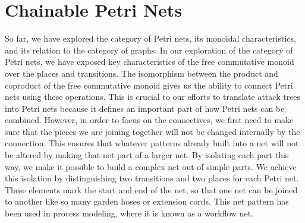 \section{Chainable Petri Nets}
So far, we have explored the category of Petri nets, its monoidal characteristics, and its relation to the category of graphs. In our exploration of the category of Petri nets, we have exposed key characteristics of the free commutative monoid over the places and transitions. The isomorphism between the product and coproduct of the free commutative monoid gives us the ability to connect Petri nets using these operations. This is crucial to our efforts to translate attack trees into Petri nets because it defines an important part of how Petri nets can be combined. However, in order to focus on the connectives, we first need to make sure that the pieces we are joining together will not be changed internally by the connection. This ensures that whatever patterns already built into a net will not be altered by making that net part of a larger net. By isolating each part this way, we make it possible to build a complex net out of simple parts. We achieve this isolation by distinguishing two transitions and two places for each Petri net. These elements mark the start and end of the net, so that one net can be joined to another like so many garden hoses or extension cords. This net pattern has been used in process modeling, where it is known as a workflow net. 
